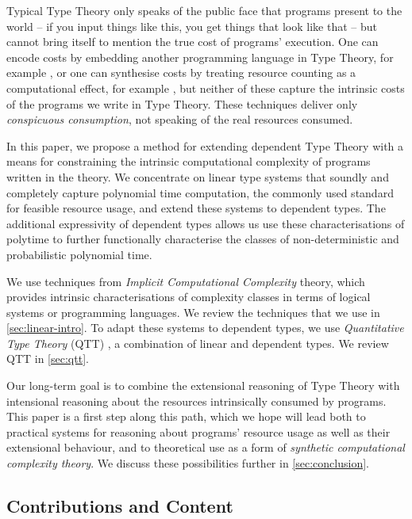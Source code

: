 \documentclass[acmsmall,screen]{acmart}
\begin{document}
Typical Type Theory only speaks of the public face that programs
present to the world -- if you input things like this, you get things
that look like that -- but cannot bring itself to mention the true
cost of programs' execution. One can encode costs by embedding another
programming language in Type Theory, for example \cite{GueneauCP18},
or one can synthesise costs by treating resource counting as a
computational effect, for example \cite{Danielsson08,NiuSGH22}, but
neither of these capture the intrinsic costs of the programs we write
in Type Theory. These techniques deliver only \emph{conspicuous
  consumption}, not speaking of the real resources consumed.

In this paper, we propose a method for extending dependent Type Theory
with a means for constraining the intrinsic computational complexity
of programs written in the theory. We concentrate on linear type
systems that soundly and completely capture polynomial time
computation, the commonly used standard for feasible resource usage,
and extend these systems to dependent types. The additional
expressivity of dependent types allows us use these characterisations
of polytime to further functionally characterise the classes of
non-deterministic and probabilistic polynomial time.

We use techniques from \emph{Implicit Computational Complexity}
theory, which provides intrinsic characterisations of complexity
classes in terms of logical systems or programming languages. We
review the techniques that we use in \autoref{sec:linear-intro}. To
adapt these systems to dependent types, we use \emph{Quantitative Type
  Theory} (QTT) \cite{atkey18qtt,mcbride16}, a combination of linear
and dependent types. We review QTT in \autoref{sec:qtt}.

Our long-term goal is to combine the extensional reasoning of Type
Theory with intensional reasoning about the resources intrinsically
consumed by programs. This paper is a first step along this path,
which we hope will lead both to practical systems for reasoning about
programs' resource usage as well as their extensional behaviour, and
to theoretical use as a form of \emph{synthetic computational
  complexity theory}. We discuss these possibilities further in
\autoref{sec:conclusion}.

\subsection{Contributions and Content}
\end{document}
